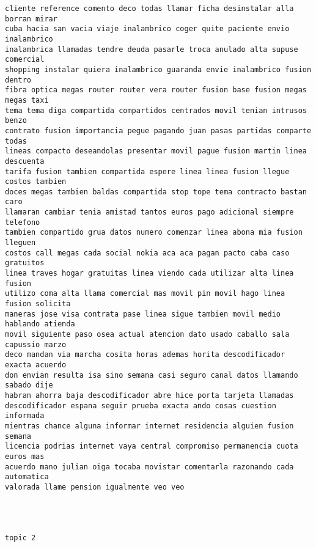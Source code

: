 \begin{Verbatim}[commandchars=\\\{\}]
cliente reference comento deco todas llamar ficha desinstalar alla borran mirar
cuba hacia san vacia viaje inalambrico coger quite paciente envio inalambrico
inalambrica llamadas tendre deuda pasarle troca anulado alta supuse comercial
shopping instalar quiera inalambrico guaranda envie inalambrico fusion dentro
fibra optica megas router router vera router fusion base fusion megas megas taxi
tema tema diga compartida compartidos centrados movil tenian intrusos benzo
contrato fusion importancia pegue pagando juan pasas partidas comparte todas
lineas compacto deseandolas presentar movil pague fusion martin linea descuenta
tarifa fusion tambien compartida espere linea linea fusion llegue costos tambien
doces megas tambien baldas compartida stop tope tema contracto bastan caro
llamaran cambiar tenia amistad tantos euros pago adicional siempre telefono
tambien compartido grua datos numero comenzar linea abona mia fusion lleguen
costos call megas cada social nokia aca aca pagan pacto caba caso gratuitos
linea traves hogar gratuitas linea viendo cada utilizar alta linea fusion
utilizo coma alta llama comercial mas movil pin movil hago linea fusion solicita
maneras jose visa contrata pase linea sigue tambien movil medio hablando atienda
movil siguiente paso osea actual atencion dato usado caballo sala capussio marzo
deco mandan via marcha cosita horas ademas horita descodificador exacta acuerdo
don envian resulta isa sino semana casi seguro canal datos llamando sabado dije
habran ahorra baja descodificador abre hice porta tarjeta llamadas
descodificador espana seguir prueba exacta ando cosas cuestion informada
mientras chance alguna informar internet residencia alguien fusion semana
licencia podrias internet vaya central compromiso permanencia cuota euros mas
acuerdo mano julian oiga tocaba movistar comentarla razonando cada automatica
valorada llame pension igualmente veo veo




topic 2


\end{Verbatim}
